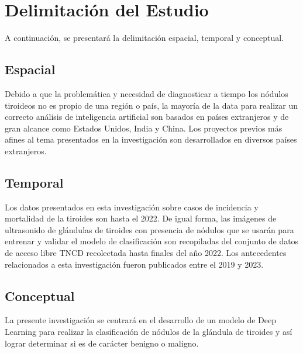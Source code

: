 \section{Delimitación del Estudio}
A continuación, se presentará la delimitación espacial, temporal y conceptual.

\subsection{Espacial}
Debido a que la problemática y necesidad de diagnosticar a tiempo los nódulos tiroideos no es propio de una región o país, la mayoría de la data para realizar un correcto análisis de inteligencia artificial son basados en países extranjeros y de gran alcance como Estados Unidos, India y China. Los proyectos previos más afines al tema presentados en la investigación son desarrollados en diversos países extranjeros. 

\subsection{Temporal}
Los datos presentados en esta investigación sobre casos de incidencia y mortalidad de la tiroides son hasta el 2022. De igual forma, las imágenes de ultrasonido de glándulas de tiroides con presencia de nódulos que se usarán para entrenar y validar el modelo de clasificación son recopiladas del conjunto de datos de acceso libre TNCD recolectada hasta finales del año 2022. Los antecedentes relacionados a esta investigación fueron publicados entre el 2019 y 2023.

\subsection{Conceptual}
La presente investigación se centrará en el desarrollo de un modelo de Deep Learning para realizar la clasificación de nódulos de la glándula de tiroides y así lograr determinar si es de carácter benigno o maligno. 
